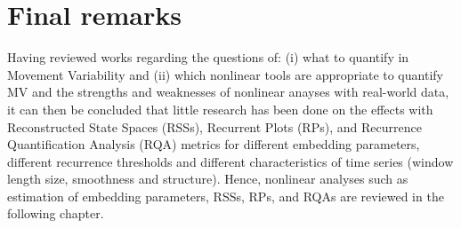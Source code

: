 %


\section{Final remarks}
Having reviewed works regarding the questions of: (i) what to quantify in 
Movement Variability and (ii) which nonlinear tools are appropriate to quantify 
MV and the strengths and weaknesses of nonlinear anayses with 
real-world data, it can then be concluded that little research has been done 
on the effects with Reconstructed State Spaces (RSSs), Recurrent Plots (RPs), 
and Recurrence Quantification Analysis (RQA) metrics for different 
embedding parameters, different recurrence thresholds and different 
characteristics of time series (window length size, smoothness and structure).
Hence, nonlinear analyses such as estimation of embedding parameters, 
RSSs, RPs, and RQAs are reviewed in the following chapter.





